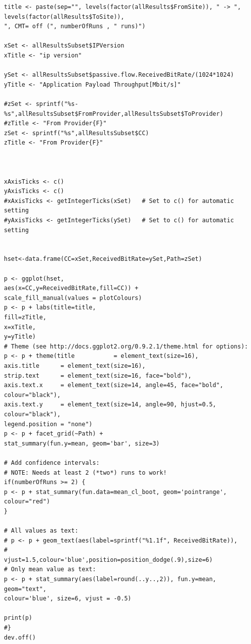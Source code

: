 \documentclass[a4paper,12pt]{ctexbook}
\begin{document}
\begin{flushleft}
\begin{verbatim}
title <- paste(sep="", levels(factor(allResults$FromSite)), " -> ", levels(factor(allResults$ToSite)),
", CMT= off (", numberOfRuns , " runs)")

xSet <- allResultsSubset$IPVersion
xTitle <- "ip version"

ySet <- allResultsSubset$passive.flow.ReceivedBitRate/(1024*1024)
yTitle <- "Application Payload Throughput[Mbit/s]"

#zSet <- sprintf("%s-%s",allResultsSubset$FromProvider,allResultsSubset$ToProvider)
#zTitle <- "From Provider{F}"
zSet <- sprintf("%s",allResultsSubset$CC)
zTitle <- "From Provider{F}"



xAxisTicks <- c()
yAxisTicks <- c()
#xAxisTicks <- getIntegerTicks(xSet)   # Set to c() for automatic setting
#yAxisTicks <- getIntegerTicks(ySet)   # Set to c() for automatic setting


hset<-data.frame(CC=xSet,ReceivedBitRate=ySet,Path=zSet)

p <- ggplot(hset,
aes(x=CC,y=ReceivedBitRate,fill=CC)) +
scale_fill_manual(values = plotColours)
p <- p + labs(title=title,
fill=zTitle,
x=xTitle,
y=yTitle)
# Theme (see http://docs.ggplot2.org/0.9.2.1/theme.html for options):
p <- p + theme(title           = element_text(size=16),
axis.title      = element_text(size=16),
strip.text      = element_text(size=16, face="bold"),
axis.text.x     = element_text(size=14, angle=45, face="bold", colour="black"),
axis.text.y     = element_text(size=14, angle=90, hjust=0.5, colour="black"),
legend.position = "none")
p <- p + facet_grid(~Path) + 
stat_summary(fun.y=mean, geom='bar', size=3)

# Add confidence intervals:
# NOTE: Needs at least 2 (*two*) runs to work!
if(numberOfRuns >= 2) {
p <- p + stat_summary(fun.data=mean_cl_boot, geom='pointrange', colour="red")
}

# All values as text:
# p <- p + geom_text(aes(label=sprintf("%1.1f", ReceivedBitRate)),
#                    vjust=1.5,colour='blue',position=position_dodge(.9),size=6)
# Only mean value as text:
p <- p + stat_summary(aes(label=round(..y..,2)), fun.y=mean, geom="text",
colour='blue', size=6, vjust = -0.5)

print(p)
#}
dev.off()	
\end{verbatim}





\end{flushleft}
\end{document}
